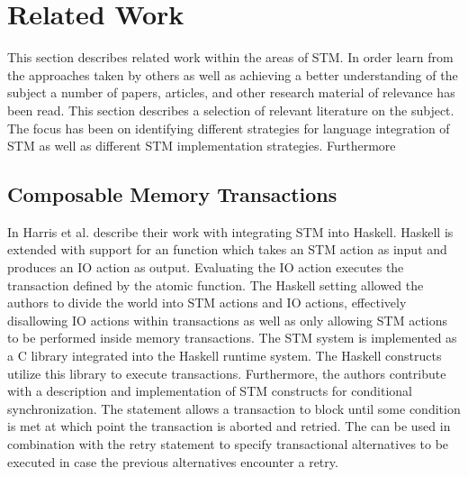 \section{Related Work}
This section describes related work within the areas of \ac{STM}. In order learn from the approaches taken by others as well as achieving a better understanding of the subject a number of papers, articles, and other research material of relevance has been read. This section describes a selection of relevant literature on the subject. The focus has been on identifying different strategies for language integration of \ac{STM} as well as different \ac{STM} implementation strategies. Furthermore 

\subsection{Composable Memory Transactions}
In \cite{harris2005composable} Harris et al. describe their work with integrating \ac{STM} into Haskell. Haskell is extended with support for an  function which takes an \ac{STM} action as input and produces an \ac{IO} action as output\cite[p. 51]{harris2005composable}. Evaluating the IO action executes the transaction defined by the atomic function. The Haskell setting allowed the authors to divide the world into \ac{STM} actions and \ac{IO} actions\cite[p. 51]{harris2005composable}, effectively disallowing \ac{IO} actions within transactions as well as only allowing \ac{STM} actions to be performed inside memory transactions. The \ac{STM} system is implemented as a C library integrated into the Haskell runtime system. The Haskell constructs utilize this library to execute transactions\cite[p. 56]{harris2005composable}. Furthermore, the authors contribute with a description and implementation of \ac{STM} constructs for conditional synchronization. The  statement allows a transaction to block until some condition is met at which point the transaction is aborted and retried\cite[p. 52]{harris2005composable}. The  can be used in combination with the retry statement to specify transactional alternatives to be executed in case the previous alternatives encounter a retry\cite[p. 52]{harris2005composable}.

